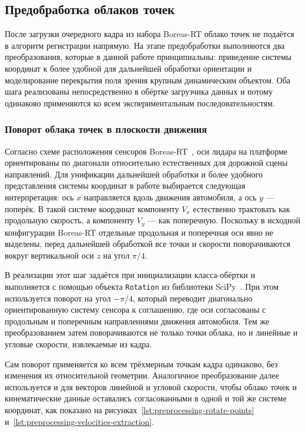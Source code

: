 \subsection{Предобработка облаков точек}
\label{sec:2-2-preprocessing}

После загрузки очередного кадра из набора Boreas-RT облако точек не подаётся в алгоритм регистрации напрямую. На этапе предобработки выполняются два преобразования, которые в данной работе принципиальны: приведение системы координат к более удобной для дальнейшей обработки ориентации и моделирование перекрытия поля зрения крупным динамическим объектом. Оба шага реализованы непосредственно в обёртке загрузчика данных и потому одинаково применяются ко всем экспериментальным последовательностям.

\subsubsection{Поворот облака точек в плоскости движения}

Согласно схеме расположения сенсоров Boreas-RT~\cite{boreas-rt-sensors-image}, оси лидара на платформе ориентированы по диагонали относительно естественных для дорожной сцены направлений. Для унификации дальнейшей обработки и более удобного представления системы координат в работе выбирается следующая интерпретация: ось \(x\) направляется вдоль движения автомобиля, а ось \(y\) --- поперёк. В такой системе координат компоненту \(V_x\) естественно трактовать как продольную скорость, а компоненту \(V_y\) --- как поперечную. Поскольку в исходной конфигурации Boreas-RT отдельные продольная и поперечная оси явно не выделены, перед дальнейшей обработкой все точки и скорости поворачиваются вокруг вертикальной оси \(z\) на угол \(\pi / 4\).

В реализации этот шаг задаётся при инициализации класса-обёртки и выполняется с помощью объекта \texttt{Rotation} из библиотеки SciPy~\cite{scipy-rotation}. При этом используется поворот на угол \(-\pi / 4\), который переводит диагонально ориентированную систему сенсора к соглашению, где оси согласованы с продольным и поперечным направлениями движения автомобиля. Тем же преобразованием затем поворачиваются не только точки облака, но и линейные и угловые скорости, извлекаемые из кадра.

Сам поворот применяется ко всем трёхмерным точкам кадра одинаково, без изменения их относительной геометрии. Аналогичное преобразование далее используется и для векторов линейной и угловой скорости, чтобы облако точек и кинематические данные оставались согласованными в одной и той же системе координат, как показано на рисунках~\ref{lst:preprocessing-rotate-points} и~\ref{lst:preprocessing-velocities-extraction}.

